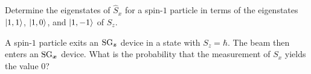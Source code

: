 \documentclass{../phys116}
\begin{document}
\begin{solution}

\end{solution}

\begin{exercise}
  \begin{problems}
  \item Determine the eigenstates of \(\hat S_x\) for a spin-\(1\)
    particle in terms of the eigenstates \(\lvert1, 1\rangle\),
    \(\lvert1, 0\rangle\), and \(\lvert1, -1\rangle\) of \(\hat S_z\).
  \item A spin-\(1\) particle exits an \(\SG_{\vec z}\) device in a
    state with \(S_z =\hbar\).  The beam then enters an
    \(\SG_{\vec x}\) device.  What is the probability that the
    measurement of \(S_x\) yields the value \(0\)?
  \end{problems}
\end{exercise}

\begin{solution}

\end{solution}
\end{document}
